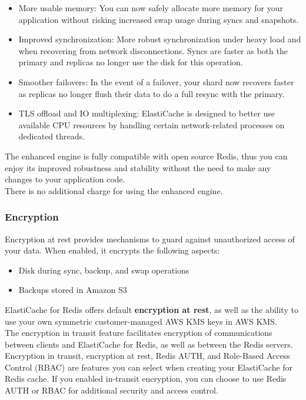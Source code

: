 \documentclass[12pt, letterpaper, twoside]{article}
\begin{document}
\begin{itemize}
\item More usable memory: You can now safely allocate more memory for your application without risking increased swap usage 
	during syncs and snapshots.
\item Improved synchronization: More robust synchronization under heavy load and when recovering from network disconnections. 
	Syncs are faster as both the primary and replicas no longer use the disk for this operation.
\item Smoother failovers: In the event of a failover, your shard now recovers faster as replicas no longer flush their data to 
	do a full resync with the primary.
\item TLS offload and IO multiplexing: ElastiCache is designed to better use available CPU resources by handling certain 
	network-related processes on dedicated threads.
\end{itemize}
The enhanced engine is fully compatible with open source Redis, thus you can enjoy its improved robustness and stability without 
the need to make any changes to your application code.\\

There is no additional charge for using the enhanced engine.

\subsubsection{Encryption}
Encryption at rest provides mechanisms to guard against unauthorized access of your data. When enabled, it encrypts the following aspects:
\begin{itemize}
	\item Disk during sync, backup, and swap operations
	\item Backups stored in Amazon S3
\end{itemize}
ElastiCache for Redis offers default \textbf{encryption at rest}, as well as the ability to use your own symmetric customer-managed 
AWS KMS keys in AWS KMS.\\

The encryption in transit feature facilitates encryption of communications between clients and ElastiCache for Redis, as well as 
between the Redis servers.\\

Encryption in transit, encryption at rest, Redis AUTH, and Role-Based Access Control (RBAC) are features you can select when 
creating your ElastiCache for Redis cache. If you enabled in-transit encryption, you can choose to use Redis AUTH or RBAC 
for additional security and access control.\\
\end{document}
